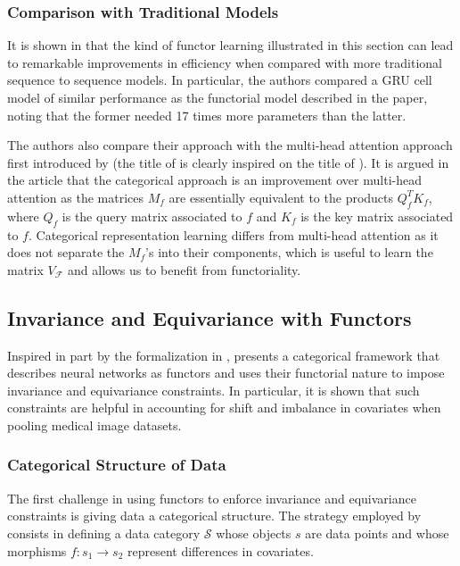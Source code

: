 \documentclass[11pt,a4paper,openright,twoside]{report}
\theoremstyle{plain}
\theoremstyle{definition}
\begin{document}
\subsubsection{Comparison with Traditional Models}

It is shown in \cite{sheshmaniCategoricalRepresentationLearning2022} that the kind of functor learning illustrated in this section can lead to remarkable improvements in efficiency when compared with more traditional sequence to sequence models. In particular, the authors compared a GRU cell model of similar performance as the functorial model described in the paper, noting that the former needed 17 times more parameters than the latter.


The authors also compare their approach with the multi-head attention approach first introduced by \cite{vaswaniAttentionAllYou2023} (the title of \cite{sheshmaniCategoricalRepresentationLearning2022} is clearly inspired on the title of \cite{vaswaniAttentionAllYou2023}). It is argued in the article that the categorical approach is an improvement over multi-head attention as the matrices $M_f$ are essentially equivalent to the products $Q_f^TK_f$, where $Q_f$ is the query matrix associated to $f$ and $K_f$ is the key matrix associated to $f$. Categorical representation learning differs from multi-head attention as it does not separate the $M_f$'s into their components, which is useful to learn the matrix $V_{\mathcal{F}}$ and allows us to benefit from functoriality. 


\subsection{Invariance and Equivariance with Functors}

Inspired in part by the formalization in \cite{gavranovicLearningFunctorsUsing2020}, \cite{chytasPoolingImageDatasets2024} presents a categorical framework that describes neural networks as functors and uses their functorial nature to impose invariance and equivariance constraints. In particular, it is shown that such constraints are helpful in accounting for shift and imbalance in covariates when pooling medical image datasets.


\subsubsection{Categorical Structure of Data}

The first challenge in using functors to enforce invariance and equivariance constraints is giving data a categorical structure. The strategy employed by \cite{chytasPoolingImageDatasets2024} consists in defining a data category $\mathcal{S}$ whose objects $s$ are data points and whose morphisms $f: s_1 \to s_2$ represent differences in covariates. 
\end{document}
